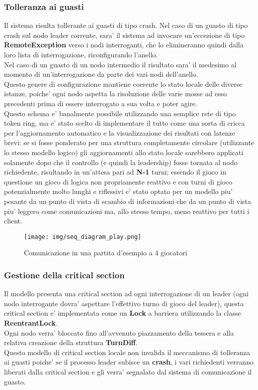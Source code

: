 \subsubsection{Tolleranza ai guasti}
	Il sistema risulta tollerante ai guasti di tipo crash.
	Nel caso di un guasto di tipo crash sul nodo leader corrente, sara' il
	sistema ad invocare un'eccezione di tipo \textbf{RemoteException} verso
	i nodi interroganti, che lo elimineranno quindi dalla loro lista di
	interrogazione, riconfigurando l'anello.\\
	Nel caso di un guasto di un nodo intermedio il risultato sara' il
	medesimo al momento di un'interrogazione da parte dei vari nodi
	dell'anello.\\
	Questo genere di configurazione mantiene coerente lo stato locale delle
	diverse istanze, poiche' ogni nodo aspetta la risoluzione delle varie
	mosse ad esso precedenti prima di essere interrogato a sua volta e poter
	agire.\\
	Questo schema e' banalmente possibile utilizzando una semplice rete di
	tipo token ring, ma e' stato scelto di implementare il tutto come una
	sorta di cricca per l'aggiornamento automatico e la visualizzazione dei
	risultati con latenze brevi: se si fosse ponderato per una struttura
	completamente circolare (utilizzante lo stesso modello logico) gli
	aggiornamenti allo stato locale sarebbero applicati solamente dopo che
	il controllo (e quindi la leadership) fosse tornata al nodo richiedente,
	risultando in un'attesa pari ad \textbf{N-1} turni; essendo il gioco
	in questione un gioco di logica non propriamente reattivo e con turni
	di gioco potenzialmente molto lunghi e riflessivi e' stato optato
	per un modello piu' pesante da un punto di vista
	di scambio di informazioni che da un punto di vista piu' leggero come
	comunicazioni ma, allo stesso tempo, meno reattivo per tutti i client.

\begin{figure}[H]
	\centering
	\texttt{[image: img/seq\_diagram\_play.png]}
	\caption{Comunicazione in una partita d'esempio a 4 giocatori}
\end{figure}

\subsubsection{Gestione della critical section}
	Il modello presenta una critical section ad ogni interrogazione di un leader
	(ogni nodo interrogante dovra' aspettare l'effettivo turno
	di gioco del leader), questa critical section e' implementata come un
	\textbf{Lock} a barriera utilizzando la classe \textbf{ReentrantLock}.\\
	Ogni nodo verra' bloccato fino all'avvenuto piazzamento della tessera e
	alla relativa creazione della struttura \textbf{TurnDiff}.\\
	Questo modello di critical section locale non invalida il meccanismo di
	tolleranza ai guasti poiche' se il processo leader subisce un
	\textbf{crash}, i vari richiedenti verranno liberati dalla critical
	section e gli verra' segnalato dal sistema di comunicazione il guasto.
